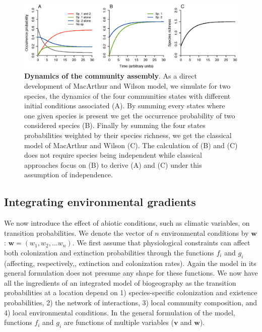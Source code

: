 \begin{figure}[h!]
\centering
\includegraphics[width=\textwidth]{./chapitre1/fig1.eps}
\caption[Dynamics of the community assembly]{\textbf{Dynamics of the community assembly}. As a direct development of MacArthur and Wilson model, we simulate for two species, the dynamics of the four communities states with different initial conditions associated (A). By summing every states where one given species is present we get the occurrence probability of two considered species (B). Finally by summing the four states probabilities weighted by their species richness, we get the classical model of MacArthur and Wilson (C). The calculation of (B) and (C) does not require species being independent while classical approaches focus on (B) to derive (A) and (C) under this assumption of independence.}
\label{chap1fig1}
\end{figure}





\subsection{Integrating environmental gradients}

We now introduce the effect of abiotic conditions, such as climatic variables, on transition probabilities. We denote the vector of $n$ environmental conditions by $\mathbf{w}$: $\mathbf{w}=(w_1,w_2,...w_n)$. We first assume that physiological constraints can affect both colonization and extinction probabilities through the functions $f_i$ and $g_i$ (affecting, respectively,, extinction and colonization rates). Again the model in its general formulation does not presume any shape for these functions. We now have all the ingredients of an integrated model of biogeography as the transition probabilities at a location depend on 1) species-specific colonization and existence probabilities, 2) the network of interactions, 3) local community composition, and 4) local environmental conditions. In the general formulation of the model, functions $f_i$ and $g_i$ are functions of multiple variables ($\mathbf{v}$ and $\mathbf{w}$).


